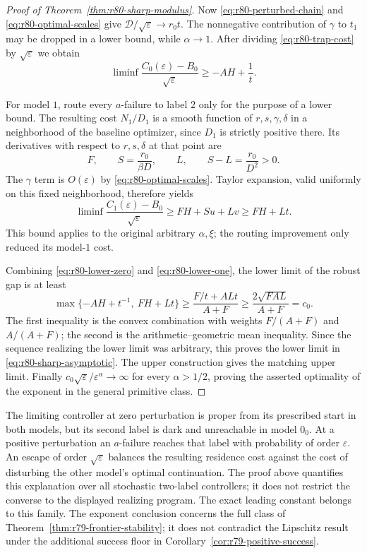 \begin{proof}[Proof of Theorem~\ref{thm:r80-sharp-modulus}]
Now \eqref{eq:r80-perturbed-chain} and
\eqref{eq:r80-optimal-scales} give
$\mathcal D/\sqrt\varepsilon\longrightarrow r_0t$.
The nonnegative contribution of $\gamma$ to $t_1$ may be
dropped in a lower bound, while $\alpha\longrightarrow1$.
After dividing \eqref{eq:r80-trap-cost} by
$\sqrt\varepsilon$ we obtain
\begin{equation}\label{eq:r80-lower-zero}
 \liminf\frac{C_0(\varepsilon)-B_0}{\sqrt\varepsilon}
                       \ge-AH+\frac1t.
\end{equation}

For model $1$, route every $a$-failure to label $2$ only for the
purpose of a lower bound.  The resulting cost $N_1/D_1$ is a
smooth function of $r,s,\gamma,\delta$ in a neighborhood of the
baseline optimizer, since $D_1$ is strictly positive there.
Its derivatives with respect to $r,s,\delta$ at that point are
\[
 F,\qquad S=\frac{r_0}{\beta D},\qquad L,
 \qquad S-L=\frac{r_0}{D^2}>0.
\]
The $\gamma$ term is $O(\varepsilon)$ by
\eqref{eq:r80-optimal-scales}.  Taylor expansion, valid uniformly
on this fixed neighborhood, therefore yields
\begin{equation}\label{eq:r80-lower-one}
 \liminf\frac{C_1(\varepsilon)-B_0}{\sqrt\varepsilon}
       \ge FH+Su+Lv\ge FH+Lt.
\end{equation}
This bound applies to the original arbitrary $\alpha,\xi$;
the routing improvement only reduced its model-$1$ cost.

Combining \eqref{eq:r80-lower-zero} and
\eqref{eq:r80-lower-one}, the lower limit of the robust gap is
at least
\[
 \max\{-AH+t^{-1},\ FH+Lt\}
 \ge\frac{F/t+ALt}{A+F}
 \ge\frac{2\sqrt{FAL}}{A+F}=c_0.
\]
The first inequality is the convex combination with weights
$F/(A+F)$ and $A/(A+F)$; the second is the arithmetic--geometric
mean inequality.  Since the sequence realizing the lower limit
was arbitrary, this proves the lower limit in
\eqref{eq:r80-sharp-asymptotic}.  The upper construction gives the
matching upper limit.  Finally
$c_0\sqrt\varepsilon/\varepsilon^\alpha\longrightarrow\infty$
for every $\alpha>1/2$, proving the asserted optimality of the
exponent in the general primitive class.
\end{proof}

The limiting controller at zero perturbation is proper from its
prescribed start in both models, but its second label is dark and
unreachable in model $0_0$.  At a positive perturbation an
$a$-failure reaches that label with probability of order
$\varepsilon$.  An escape of order $\sqrt\varepsilon$ balances
the resulting residence cost against the cost of disturbing the
other model's optimal continuation.  The proof above quantifies
this explanation over all stochastic two-label controllers; it
does not restrict the converse to the displayed realizing program.
The exact leading constant belongs to this family.  The exponent
conclusion concerns the full class of
Theorem~\ref{thm:r79-frontier-stability}; it does not contradict
the Lipschitz result under the additional success floor in
Corollary~\ref{cor:r79-positive-success}.
